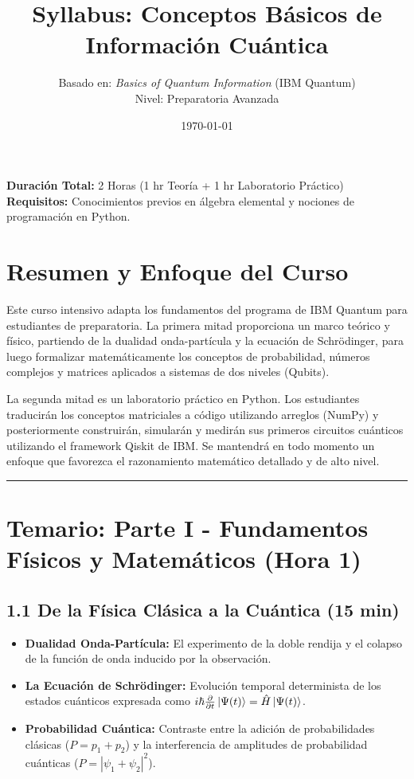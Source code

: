 \documentclass[12pt, a4paper]{article}
\title{\textbf{Syllabus: Conceptos Básicos de Información Cuántica}}
\author{Basado en: \textit{Basics of Quantum Information} (IBM Quantum) \\ Nivel: Preparatoria Avanzada}
\date{\today}
\begin{document}
\maketitle

\noindent\textbf{Duración Total:} 2 Horas (1 hr Teoría + 1 hr Laboratorio Práctico) \\
\textbf{Requisitos:} Conocimientos previos en álgebra elemental y nociones de programación en Python.

\section*{Resumen y Enfoque del Curso}
Este curso intensivo adapta los fundamentos del programa de IBM Quantum para estudiantes de preparatoria. La primera mitad proporciona un marco teórico y físico, partiendo de la dualidad onda-partícula y la ecuación de Schrödinger, para luego formalizar matemáticamente los conceptos de probabilidad, números complejos y matrices aplicados a sistemas de dos niveles (Qubits). 

La segunda mitad es un laboratorio práctico en Python. Los estudiantes traducirán los conceptos matriciales a código utilizando arreglos (NumPy) y posteriormente construirán, simularán y medirán sus primeros circuitos cuánticos utilizando el framework Qiskit de IBM. Se mantendrá en todo momento un enfoque que favorezca el razonamiento matemático detallado y de alto nivel.

\vspace{0.5cm}

\hrule
\vspace{0.5cm}

\section*{Temario: Parte I - Fundamentos Físicos y Matemáticos (Hora 1)}

\subsection*{1.1 De la Física Clásica a la Cuántica (15 min)}
\begin{itemize}
    \item \textbf{Dualidad Onda-Partícula:} El experimento de la doble rendija y el colapso de la función de onda inducido por la observación.
    \item \textbf{La Ecuación de Schrödinger:} Evolución temporal determinista de los estados cuánticos expresada como $i\hbar \frac{\partial}{\partial t}\ket{\Psi(t)} = \hat{H}\ket{\Psi(t)}$.
    \item \textbf{Probabilidad Cuántica:} Contraste entre la adición de probabilidades clásicas ($P = p_1 + p_2$) y la interferencia de amplitudes de probabilidad cuánticas ($P = |\psi_1 + \psi_2|^2$).
\end{itemize}
\end{document}
